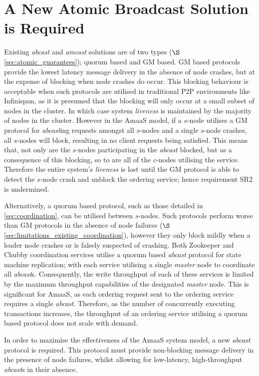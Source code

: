 \section{A New Atomic Broadcast Solution is Required}
Existing \emph{abcast} and \emph{amcast} solutions are of two types ($\S$ \ref{sec:atomic_guarantees}); quorum based and GM based.  GM based protocols provide the lowest latency message delivery in the absence of node crashes, but at the expense of blocking when node crashes do occur.  This blocking behaviour is acceptable when such protocols are utilised in traditional P2P environments like Infinispan, as it is presumed that the blocking will only occur at a small subset of nodes in the cluster.  In which case system \emph{liveness} is maintained by the majority of nodes in the cluster.  However in the \textsf{AmaaS} model, if a $s$-node utilises a GM protocol for \emph{abcast}ing requests amongst all $s$-nodes and a single $s$-node crashes, all $s$-nodes will block, resulting in no client requests being satisfied. This means that, not only are the $s$-nodes participating in the \emph{abcast} blocked, but as a consequence of this blocking, so to are all of the $c$-nodes utilising the service.  Therefore the entire system's \emph{liveness} is lost until the GM protocol is able to detect the $s$-node crash and unblock the ordering service; hence requirement SR2 is undermined.  

Alternatively, a quorum based protocol, such as those detailed in \ref{sec:coordination}, can be utilised between $s$-nodes.  Such protocols perform worse than GM protocols in the absence of node failures ($\S$ \ref{sec:limitations_existing_coordination}), however they only block mildly when a leader node crashes or is falsely suspected of crashing.  Both Zookeeper and Chubby coordination services utilise a quorum based \emph{abcast} protocol for state machine replication; with each service utilising a single \emph{master} node to coordinate all \emph{abcast}s.  Consequently, the write throughput of each of these services is limited by the maximum throughput capabilities of the designated \emph{master} node.  This is significant for \textsf{AmaaS}, as each ordering request sent to the ordering service requires a single \emph{abcast}.  Therefore, as the number of concurrently executing transactions increases, the throughput of an ordering service utilising a quorum based protocol does not scale with demand.    

In order to maximise the effectiveness of the \textsf{AmaaS} system model, a new \emph{abcast} protocol is required.  This protocol must provide non-blocking message delivery in the presence of node failures, whilst allowing for low-latency, high-throughput \emph{abcast}s in their absence.  

